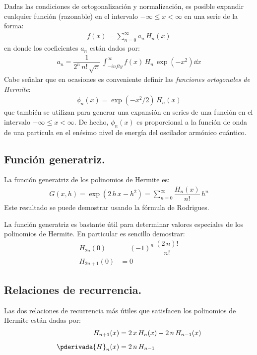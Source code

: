 Dadas las condiciones de ortogonalización y normalización, es posible expandir cualquier función (razonable) en el intervalo $-\infty \leq x < \infty$ en una serie de la forma:
\begin{align*}
f(x) = \sum_{n=0}^{\infty} a_{n} \, H_{n} (x)
\end{align*}
en donde los coeficientes $a_{n}$ están dados por:
\begin{align*}
a_{n} = \dfrac{1}{2^{n} \, n! \, \sqrt{\pi}} \, \int_{-infty}^{\infty} f(x) \, H_{n} \, \exp(-x^{2}) \dd{x}
\end{align*}
Cabe señalar que en ocasiones es conveniente definir las \emph{funciones ortogonales de Hermite}:
\begin{align*}
\phi_{n} (x) = \exp(-x^{2}/2) \, H_{n} (x) 
\end{align*}
que también se utilizan para generar una expansión en series de una función en el intervalo $-\infty \leq x < \infty$. De hecho, $\phi_{n}(x)$ es proporcional a la función de onda de una partícula en el enésimo nivel de energía del oscilador armónico cuántico.

\subsection{Función generatriz.}

La función generatriz de los polinomios de Hermite es:
\begin{align}
G(x, h) = \exp(2 \, h \, x - h^{2}) = \sum_{n=0}^{\infty} \dfrac{H_{n}(x)}{n!} \, h^{n}
\label{eq:ecuacion_18_133}
\end{align}
Este resultado se puede demostrar usando la fórmula de Rodrigues.
\par
La función generatriz es bastante útil para determinar valores especiales de los polinomios de Hermite. En particular es sencillo demostrar:
\begin{align*}
H_{2n}(0) &= (-1)^{n} \, \dfrac{(2 \, n)!}{n!} \\[0.5em]
H_{2n+1}(0) &= 0
\end{align*}

\subsection{Relaciones de recurrencia.}

Las dos relaciones de recurrencia más útiles que satisfacen los polinomios de Hermite están dadas por:
\begin{align}
H_{n+1} (x) &= 2 \, x \, H_{n}(x) -  2 \, n \, H_{n-1}(x) \label{eq:ecuacion_12_134} \\[0.5em]
\pderivada{H}_{n}(x) &= 2 \, n \, H_{n-1} \label{eq:ecuacion_18_135}
\end{align}

